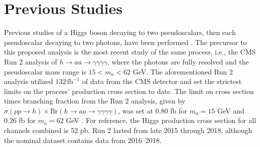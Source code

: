 \documentclass[12pt]{article}
\begin{document}

\section{Previous Studies}
Previous studies of a Higgs boson decaying to two pseudoscalars, then each pseudoscalar decaying to two photons, have been performed \cite{Run2_analysis}. The precursor to this proposed analysis is the most recent study of the same process, i.e., the CMS Run 2 analysis of $h\rightarrow aa \rightarrow \gamma\gamma\gamma\gamma$, where the photons are fully resolved and the pseudoscalar mass range is $15 < m_a < 62$ GeV. The aforementioned Run 2 analysis utilized $132\, \mathrm{fb}^{-1}$ of data from the CMS detector and set the strictest limits on the process' production cross section to date. The limit on cross section times branching fraction from the Run 2 analysis, given by $\sigma(pp \rightarrow h) \times \mathrm{Br}(h\rightarrow aa \rightarrow \gamma\gamma\gamma\gamma)$, was set at 0.80 fb for $m_a = 15$ GeV and 0.26 fb for $m_a = 62$ GeV \cite{Run2_analysis}. For reference, the Higgs production cross section for all channels combined is 52 pb. Run 2 lasted from late 2015 through 2018, although the nominal dataset contains data from 2016--2018.\par
\end{document}
